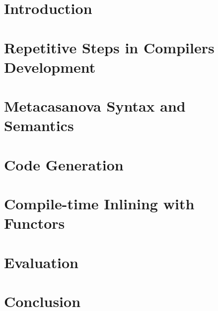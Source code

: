 \documentclass[sigplan,screen]{acmart}%
\begin{document}
\maketitle

\section{Introduction}
\label{sec:introduction}


\section{Repetitive Steps in Compilers Development}
\label{sec:problem}


\section{Metacasanova Syntax and Semantics}
\label{sec:semantics}


\section{Code Generation}
\label{sec:code_generation}


\section{Compile-time Inlining with Functors}
\label{sec:functors}


\section{Evaluation}
\label{sec:evaluation}


\section{Conclusion}
\label{sec:conclusion}




\end{document}
